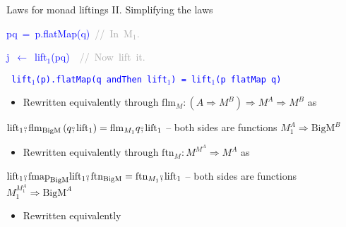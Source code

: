 \documentclass[english]{beamer}
\newenvironment{lyxcode}
  {\par\begin{list}{}{
    \setlength{\rightmargin}{\leftmargin}
    \setlength{\listparindent}{0pt}%
    \raggedright
    \setlength{\itemsep}{0pt}
    \setlength{\parsep}{0pt}
    \normalfont\ttfamily}%
   \def\{{\char`\{}
   \def\}{\char`\}}
   \def\textasciitilde{\char`\~}
   \item[]}
  {\end{list}}
\newcommand{\bef}{\ensuremath\raisebox{2pt}{$\mathsmaller{\mathsmaller{\circ}}$}\hspace{-3.3pt},}
\begin{document}
\begin{frame}{Laws for monad liftings II. Simplifying the laws}
\begin{minipage}[t]{0.5\columnwidth}
\begin{lyxcode}
\textcolor{blue}{\footnotesize{}pq~=~p.flatMap(q)~}\textrm{\textcolor{darkgray}{\footnotesize{}//~In~M$_{1}$.}}{\footnotesize\par}

\textcolor{blue}{\footnotesize{}j~$\leftarrow$~lift$_{1}$(pq)}\textrm{\textcolor{darkgray}{\footnotesize{}~~//~Now~lift~it.}}{\footnotesize\par}
\end{lyxcode}
%
\end{minipage}\texttt{\textcolor{blue}{\footnotesize{}\medskip{}
lift$_{1}$(p).flatMap(q andThen lift$_{1}$) = lift$_{1}$(p flatMap
q)}}{\footnotesize\par}
\begin{itemize}
\item Rewritten equivalently through $\text{flm}_{M}:\left(A\Rightarrow M^{B}\right)\Rightarrow M^{A}\Rightarrow M^{B}$
as
\end{itemize}
\begin{center}
{\footnotesize{}\vspace{-0.2cm}\hspace{-0.0cm}$\text{lift}_{1}\bef\text{flm}_{\text{BigM}}\left(q\bef\text{lift}_{1}\right)=\text{flm}_{M_{1}}q\bef\text{lift}_{1}$
-- both sides are functions $M_{1}^{A}\Rightarrow\text{BigM}^{B}$}{\footnotesize\par}
\par\end{center}
\begin{itemize}
\item {\footnotesize{}\vspace{-0.3cm}\hspace{-0.0cm}}Rewritten equivalently
through $\text{ftn}_{M}:M^{M^{A}}\Rightarrow M^{A}$ as
\end{itemize}
\begin{center}
{\footnotesize{}\vspace{-0.2cm}\hspace{-0.0cm}$\text{lift}_{1}\bef\text{fmap}_{\text{BigM}}\text{lift}_{1}\bef\text{ftn}_{\text{BigM}}=\text{ftn}_{M_{1}}\bef\text{lift}_{1}$
-- both sides are functions $M_{1}^{M_{1}^{A}}\Rightarrow\text{BigM}^{A}$}{\footnotesize\par}
\par\end{center}
\begin{itemize}
\item {\footnotesize{}\vspace{-0.3cm}\hspace{-0.0cm}}Rewritten equivalently

\end{itemize}
\end{frame}
\end{document}
